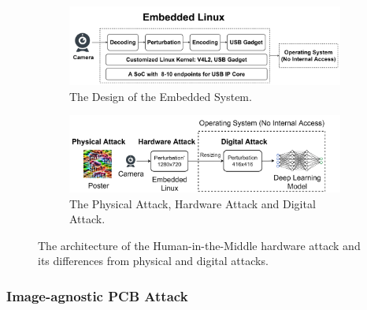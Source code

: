 \begin{figure}[bthp]
    \centering
    \begin{subfigure}[b]{0.46\textwidth}
        \includegraphics[width=0.9\linewidth]{figures/chapter_detection/hardware/design.jpg}
        \caption{The Design of the Embedded System.}
        \label{fig:design}
    \end{subfigure}
    \begin{subfigure}[b]{0.46\textwidth}
        \includegraphics[width=\linewidth]{figures/chapter_detection/hardware/minm_attack.jpg}
        \caption{The Physical Attack, Hardware Attack and Digital Attack.}
        \label{fig:comparison} 
    \end{subfigure}
  \caption{The architecture of the Human-in-the-Middle  hardware attack and its differences from physical and digital attacks.}
  \label{fig:hardware}
\end{figure}

\subsubsection{\textbf{Image-agnostic PCB Attack}}


